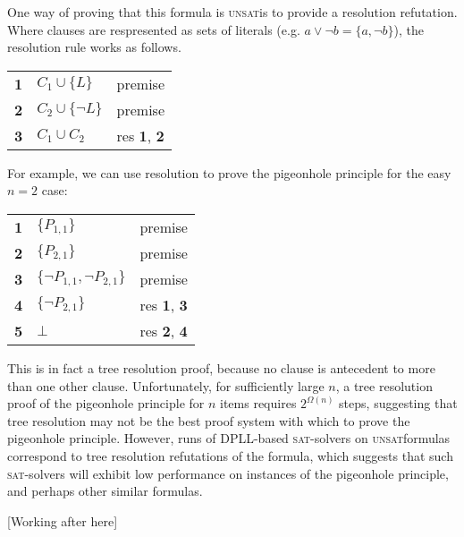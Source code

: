 \documentclass[11pt]{article}
\newcommand{\sat}{\textsc{sat}}
\newcommand{\unsat}{\textsc{unsat}}
\begin{document}
One way of proving that this formula is \unsat is to provide a resolution refutation. Where clauses are respresented as sets of literals (e.g. $a \vee \neg b = \{a, \neg b\}$), the resolution rule works as follows.

\begin{table}[h]
\begin{tabular}{lll}
{\bf 1} & $C_1 \cup \{L\}$ & premise \\
{\bf 2} & $C_2 \cup \{\neg L\}$ & premise \\
{\bf 3} & $C_1 \cup C_2$ & res {\bf 1}, {\bf 2}
\end{tabular}
\end{table}

For example, we can use resolution to prove the pigeonhole principle for the easy $n = 2$ case:

\begin{table}[h]
\begin{tabular}{lll}
{\bf 1} & $\{P_{1,1}\}$ & premise \\
{\bf 2} & $\{P_{2,1}\}$ & premise \\
{\bf 3} & $\{\neg P_{1,1}, \neg P_{2,1}\}$ & premise \\
{\bf 4} & $\{\neg P_{2,1}\}$ & res {\bf 1}, {\bf 3} \\
{\bf 5} & $\bot$ & res {\bf 2}, {\bf 4}
\end{tabular}
\end{table}

This is in fact a tree resolution proof, because no clause is antecedent to more than one other clause. Unfortunately, for sufficiently large $n$, a tree resolution proof of the pigeonhole principle for $n$ items requires $2^{\Omega(n)}$ steps, suggesting that tree resolution may not be the best proof system with which to prove the pigeonhole principle.
However, runs of DPLL-based \sat{}-solvers on \unsat formulas correspond to tree resolution refutations of the formula, which suggests that such \sat{}-solvers will exhibit low performance on instances of the pigeonhole principle, and perhaps other similar formulas.

[Working after here]




\end{document}
